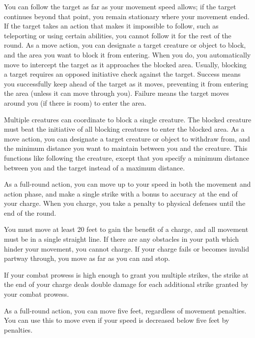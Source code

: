         You can follow the target as far as your movement speed allows; if the target continues beyond that point, you remain stationary where your movement ended. If the target takes an action that makes it impossible to follow, such as teleporting or using certain abilities, you cannot follow it for the rest of the round.
         As a move action, you can designate a target creature or object to block, and the area you want to block it from entering.
        When you do, you automatically move to intercept the target as it approaches the blocked area.
        Usually, blocking a target requires an opposed initiative check against the target.
        Success means you successfully keep ahead of the target as it moves, preventing it from entering the area (unless it can move through you).
        Failure means the target moves around you (if there is room) to enter the area.

        Multiple creatures can coordinate to block a single creature.
        The blocked creature must beat the initiative of all blocking creatures to enter the blocked area.
         As a move action, you can designate a target creature or object to withdraw from, and the minimum distance you want to maintain between you and the creature. This functions like following the creature, except that you specify a minimum distance between you and the target instead of a maximum distance.

        \label{Charge} As a full-round action, you can move up to your speed in both the movement and action phase, and make a single strike with a  bonus to accuracy at the end of your charge. When you charge, you take a  penalty to physical defenses until the end of the round.
        \par You must move at least 20 feet to gain the benefit of a charge, and all movement must be in a single straight line. If there are any obstacles in your path which hinder your movement, you cannot charge. If your charge fails or becomes invalid partway through, you move as far as you can and stop.

        \par If your combat prowess is high enough to grant you multiple strikes, the strike at the end of your charge deals double damage for each additional strike granted by your combat prowess.

         As a full-round action, you can move five feet, regardless of movement penalties. You can use this to move even if your speed is decreased below five feet by penalties.

